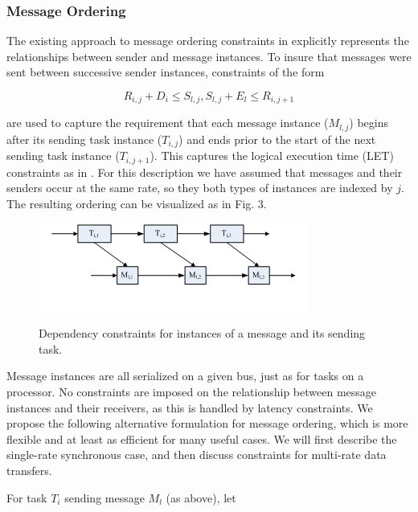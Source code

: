 \subsubsection{Message Ordering}

The existing approach to message ordering constraints in \cite{sched:offline} explicitly represents the relationships between sender and message instances.  To insure that messages were sent between successive sender instances, constraints of the form 

\begin{equation}
R_{i,j}  + D_i  \leqslant S_{l,j}, S_{l,j}  + E_l  \leqslant R_{i,j+1}
\end{equation} 

are used to capture the requirement that each message instance ($M_{l,j}$) begins after its sending task instance ($T_{i,j}$) and ends prior to the start of the next sending task instance ($T_{i,j+1}$).  This captures the logical execution time (LET) constraints as in \cite{modeling:giotto3,timed:let,timed:tdl}. For this description we have assumed that messages and their senders occur at the same rate, so they both types of instances are indexed by $j$.  The resulting ordering can be visualized as in Fig. 3.

\begin{figure}
		\includegraphics[scale=.6]{figures/ordering.png}
		\centering
	  \label{fig:ordering}
		\caption{Dependency constraints for instances of a message and its sending task.}
\end{figure}

Message instances are all serialized on a given bus, just as for tasks on a processor.  No constraints are imposed on the relationship between message instances and their receivers, as this is handled by latency constraints. We propose the following alternative formulation for message ordering, which is more flexible and at least as efficient for many useful cases. We will first describe the single-rate synchronous case, and then discuss constraints for multi-rate data transfers.

For task $T_i$ sending message $M_l$ (as above), let 

